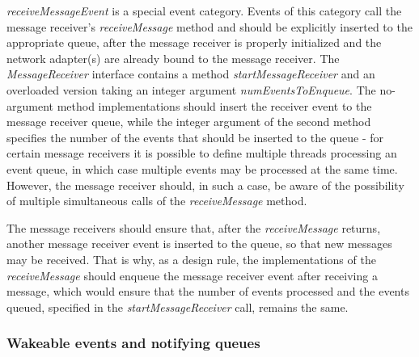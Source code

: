 \emph{receiveMessageEvent} is a special event category. Events of this category call the message receiver's \emph{receiveMessage} method and should be explicitly inserted to the appropriate queue, after the message receiver is properly initialized and the network adapter(s) are already bound to the message receiver. The \emph{MessageReceiver} interface contains a method \emph{startMessageReceiver} and an overloaded version taking an integer argument \emph{numEventsToEnqueue}. The no-argument method implementations should insert the receiver event to the message receiver queue, while the integer argument of the second method specifies the number of the events that should be inserted to the queue - for certain message receivers it is possible to define multiple threads processing an event queue, in which case multiple events may be processed at the same time. However, the message receiver should, in such a case, be aware of the possibility of multiple simultaneous calls of the \emph{receiveMessage} method.

The message receivers should ensure that, after the \emph{receiveMessage} returns, another message receiver event is inserted to the queue, so that new messages may be received. That is why, as a design rule, the implementations of the \emph{receiveMessage} should enqueue the message receiver event after receiving a message, which would ensure that the number of events processed and the events queued, specified in the \emph{startMessageReceiver} call, remains the same.








\subsubsection{Wakeable events and notifying queues}
\label{sec:libWakeables}

